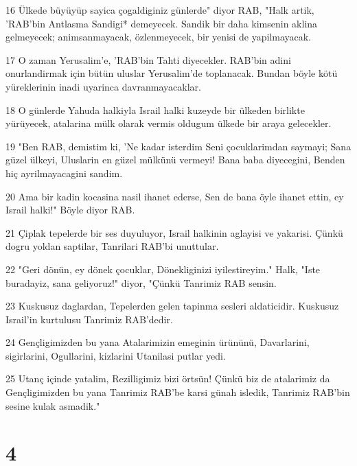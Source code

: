 \par 16 Ülkede büyüyüp sayica çogaldiginiz günlerde" diyor RAB, "Halk artik, 'RAB'bin Antlasma Sandigi* demeyecek. Sandik bir daha kimsenin aklina gelmeyecek; animsanmayacak, özlenmeyecek, bir yenisi de yapilmayacak.
\par 17 O zaman Yerusalim'e, 'RAB'bin Tahti diyecekler. RAB'bin adini onurlandirmak için bütün uluslar Yerusalim'de toplanacak. Bundan böyle kötü yüreklerinin inadi uyarinca davranmayacaklar.
\par 18 O günlerde Yahuda halkiyla Israil halki kuzeyde bir ülkeden birlikte yürüyecek, atalarina mülk olarak vermis oldugum ülkede bir araya gelecekler.
\par 19 "Ben RAB, demistim ki, 'Ne kadar isterdim Seni çocuklarimdan saymayi; Sana güzel ülkeyi, Uluslarin en güzel mülkünü vermeyi! Bana baba diyecegini, Benden hiç ayrilmayacagini sandim.
\par 20 Ama bir kadin kocasina nasil ihanet ederse, Sen de bana öyle ihanet ettin, ey Israil halki!" Böyle diyor RAB.
\par 21 Çiplak tepelerde bir ses duyuluyor, Israil halkinin aglayisi ve yakarisi. Çünkü dogru yoldan saptilar, Tanrilari RAB'bi unuttular.
\par 22 "Geri dönün, ey dönek çocuklar, Dönekliginizi iyilestireyim." Halk, "Iste buradayiz, sana geliyoruz!" diyor, "Çünkü Tanrimiz RAB sensin.
\par 23 Kuskusuz daglardan, Tepelerden gelen tapinma sesleri aldaticidir. Kuskusuz Israil'in kurtulusu Tanrimiz RAB'dedir.
\par 24 Gençligimizden bu yana Atalarimizin emeginin ürününü, Davarlarini, sigirlarini, Ogullarini, kizlarini Utanilasi putlar yedi.
\par 25 Utanç içinde yatalim, Rezilligimiz bizi örtsün! Çünkü biz de atalarimiz da Gençligimizden bu yana Tanrimiz RAB'be karsi günah isledik, Tanrimiz RAB'bin sesine kulak asmadik."

\chapter{4}

